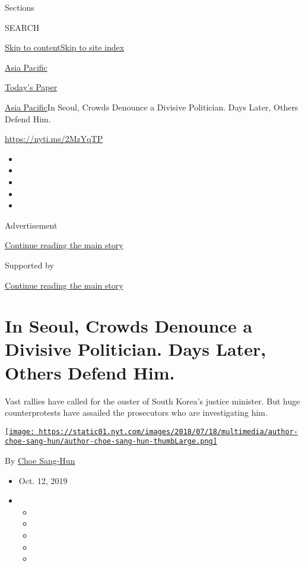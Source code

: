 Sections

SEARCH

\protect\hyperlink{site-content}{Skip to
content}\protect\hyperlink{site-index}{Skip to site index}

\href{https://www.nytimes.com/section/world/asia}{Asia Pacific}

\href{https://myaccount.nytimes.com/auth/login?response_type=cookie\&client_id=vi}{}

\href{https://www.nytimes.com/section/todayspaper}{Today's Paper}

\href{/section/world/asia}{Asia Pacific}\textbar{}In Seoul, Crowds
Denounce a Divisive Politician. Days Later, Others Defend Him.

\url{https://nyti.ms/2MzYqTP}

\begin{itemize}
\item
\item
\item
\item
\item
\end{itemize}

Advertisement

\protect\hyperlink{after-top}{Continue reading the main story}

Supported by

\protect\hyperlink{after-sponsor}{Continue reading the main story}

\hypertarget{in-seoul-crowds-denounce-a-divisive-politician-days-later-others-defend-him}{%
\section{In Seoul, Crowds Denounce a Divisive Politician. Days Later,
Others Defend
Him.}\label{in-seoul-crowds-denounce-a-divisive-politician-days-later-others-defend-him}}

Vast rallies have called for the ouster of South Korea's justice
minister. But huge counterprotests have assailed the prosecutors who are
investigating him.

\href{https://www.nytimes.com/by/choe-sang-hun}{\texttt{[image: https://static01.nyt.com/images/2018/07/18/multimedia/author-choe-sang-hun/author-choe-sang-hun-thumbLarge.png]}}

By \href{https://www.nytimes.com/by/choe-sang-hun}{Choe Sang-Hun}

\begin{itemize}
\item
  Oct. 12, 2019
\item
  \begin{itemize}
  \item
  \item
  \item
  \item
  \item
  \end{itemize}
\end{itemize}

